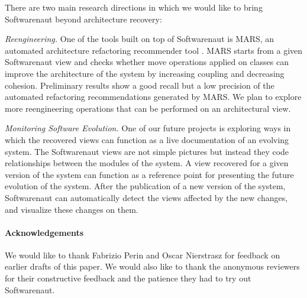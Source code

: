 \documentclass[preprint,12pt]{elsarticle}
\begin{document}
There are two main research directions in which we would like to bring Softwarenaut beyond architecture recovery:

\begin{description}

\item {\em Reengineering.} One of the tools built on top of Softwarenaut is MARS, an automated architecture refactoring recommender tool \cite{boeckmann-mars}. MARS starts from a given Softwarenaut view and checks whether move operations applied on classes can improve the architecture of the system by increasing coupling and decreasing cohesion. Preliminary results show a good recall but a low precision of the automated refactoring recommendations generated by MARS. We plan to explore more reengineering operations that can be performed on an architectural view.

\item {\em Monitoring Software Evolution.} One of our future projects is exploring ways in which the recovered views can function as a live documentation of an evolving system. The Softwarenaut views are not simple pictures but instead they code relationships between the modules of the system. A view recovered for a given version of the system can function as a reference point for presenting the future evolution of the system. After the publication of a new version of the system, Softwarenaut can automatically detect the views affected by the new changes, and visualize these changes on them.

\end{description}

\paragraph{Acknowledgements} We would like to thank Fabrizio Perin and Oscar Nierstrasz for feedback on earlier drafts of this paper. We would also like to thank the anonymous reviewers for their constructive feedback and the patience they had to try out Softwarenaut.



\end{document}
